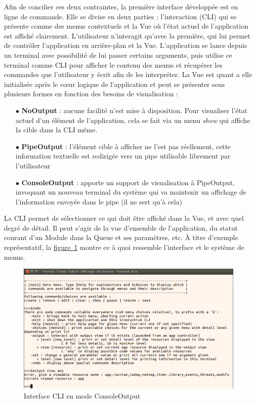 \documentclass[]{article}
\newcommand{\wordlink}[2]{\hyperref[#1]{#2~\ref{#1}}}
\begin{document}
\par Afin de concilier ces deux contraintes, la première interface développée est en ligne de commande. Elle se divise en deux parties : l'interaction (CLI) qui se présente comme des menus contextuels et la Vue où l'état actuel de l'application est affiché clairement. L'utilisateur n'interagit qu'avec la première, qui lui permet de contrôler l'application en arrière-plan et la Vue. L'application se lance depuis un terminal avec possibilité de lui passer certains arguments, puis utilise ce terminal comme CLI pour afficher le contenu des menus et récupérer les commandes que l'utilisateur y écrit afin de les interpréter. La Vue est quant a elle initialisée après le cœur logique de l'application et peut se présenter sous plusieurs formes  en fonction des besoins de visualisation :
\vspace{0.2cm}
\begin{itemize}
\item[$\bullet$] \textbf{NoOutput} : aucune facilité n'est mise à disposition. Pour visualiser l'état actuel d'un élément de l'application, cela se fait via un menu \textit{show} qui affiche la cible dans la CLI même.
\vspace{0.2cm}
\item[$\bullet$] \textbf{PipeOutput} : l'élément cible à afficher ne l'est pas réellement, cette information textuelle est redirigée vers un pipe utilisable librement par l'utilisateur
\vspace{0.2cm}
\item[$\bullet$] \textbf{ConsoleOutput} : apporte un support de visualisation à PipeOutput, invoquant un nouveau terminal du système qui va maintenir un affichage de l'information envoyée dans le pipe (il ne sert qu'à cela)
\end{itemize}
\vspace{0.2cm}

\par La CLI permet de sélectionner ce qui doit être affiché dans la Vue, et avec quel degré de détail. Il peut s'agir de la vue d'ensemble de l'application, du statut courant d'un Module dans la Queue et ses paramètres, etc. À titre d'exemple représentatif, la \wordlink{cli}{figure} montre ce à quoi ressemble l'interface et le système de menus.

\begin{figure}[!ht]
\centering
     \includegraphics[width=0.7\linewidth]{clicmds}
     \caption{Interface CLI en mode ConsoleOutput}
     \label{cli}
\end{figure}
\end{document}
